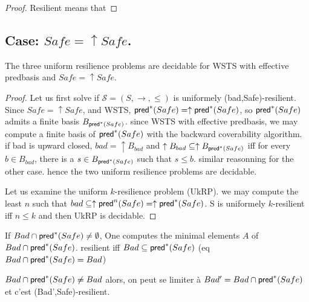 \begin{proof}
Resilient means that 
\end{proof}


\subsection{Case: $Safe=\uparrow Safe$.}


\begin{theorem}\label{up-down}
The three uniform resilience problems are decidable for WSTS with effective predbasis and $Safe=\uparrow Safe$.
\end{theorem}


\begin{proof}
Let us first solve if $\mathscr{S}=(S,\rightarrow,\leq)$ is uniformely (bad,Safe)-resilient. Since $Safe=\uparrow Safe$, and WSTS, $\textsf{pred}^*(Safe)=\uparrow \textsf{pred}^*(Safe)$, so $\textsf{pred}^*(Safe)$ admits a finite basis $B_{\textsf{pred}^*(Safe)}$. since WSTS  with effective predbasis, we may compute a finite basis of $\textsf{pred}^*(Safe)$ with the backward coverability algorithm. 
if bad  is upward closed, $bad = \uparrow B_{bad}$ and $ \uparrow B_{bad} \subseteq \uparrow B_{\textsf{pred}^*(Safe)}$ iff for every $b \in B_{bad}$, there is a $s \in B_{\textsf{pred}^*(Safe)}$ such that $s \leq b$. similar reasonning for the other case.
hence the two uniform resilience problems are decidable.

Let us examine the uniform $k$-resilience problem (UkRP). we may compute the least $n$ such that $bad \subseteq \uparrow \textsf{pred}^n(Safe)=  \uparrow \textsf{pred}^*(Safe)$. S is uniformely $k$-resilient iff $n \leq k$ and then UkRP is decidable.
\end{proof}


If $Bad \cap \textsf{pred}^*(Safe) \neq \emptyset$, One computes the minimal elements $A$ of $Bad \cap \textsf{pred}^*(Safe)$.
resilient iff $Bad \subseteq \textsf{pred}^*(Safe)$  (eq $Bad \cap \textsf{pred}^*(Safe) = Bad$)

$Bad \cap \textsf{pred}^*(Safe) \neq Bad$ alors, on peut se limiter à $Bad' = Bad \cap \textsf{pred}^*(Safe)$ et c'est (Bad',Safe)-resilient.

